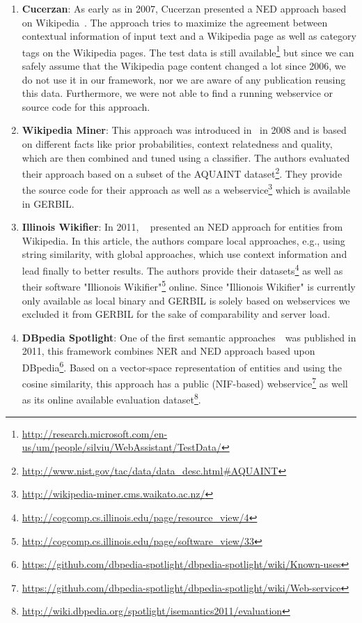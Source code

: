 \begin{enumerate}
\item \textbf{Cucerzan}: As early as in 2007, Cucerzan presented a NED approach based on Wikipedia~\cite{Cucerzan07}. The approach tries to maximize the agreement between contextual information of input text and a Wikipedia page as well as category tags on the Wikipedia pages.
The test data is still available\footnote{\url{http://research.microsoft.com/en-us/um/people/silviu/WebAssistant/TestData/}} but since we can safely assume that the Wikipedia page content changed a lot since 2006, we do not use it in our framework, nor we are aware of any publication reusing this data.
Furthermore, we were not able to find a running webservice or source code for this approach.

\item \textbf{Wikipedia Miner}: This approach was introduced in~\cite{milne2008learning} in 2008 and is based on different facts like prior probabilities, context relatedness and quality, which are then combined and tuned using a classifier.
The authors evaluated their approach based on a subset of the AQUAINT dataset\footnote{\url{http://www.nist.gov/tac/data/data_desc.html\#AQUAINT}}.
They provide the source code for their approach as well as a webservice\footnote{\url{http://wikipedia-miner.cms.waikato.ac.nz/}} which is available in GERBIL.

\item \textbf{Illinois Wikifier}: In 2011, ~\cite{rat:rot} presented an NED approach for entities from Wikipedia. 
In this article, the authors compare local approaches, e.g., using string similarity, with global approaches, which use context information and lead finally to better results.
The authors provide their datasets\footnote{\url{http://cogcomp.cs.illinois.edu/page/resource_view/4}} as well as their software "Illionois Wikifier"\footnote{\url{http://cogcomp.cs.illinois.edu/page/software_view/33}} online.
Since "Illionois Wikifier" is currently only available as local binary and GERBIL is solely based on webservices we excluded it from GERBIL for the sake of comparability and server load.

\item \textbf{DBpedia Spotlight}: One of the first semantic approaches~\cite{spotlight}\ was published in 2011, this framework combines NER and NED approach based upon DBpedia\footnote{\url{https://github.com/dbpedia-spotlight/dbpedia-spotlight/wiki/Known-uses}}. 
Based on a vector-space representation of entities and using the cosine similarity, this approach has a public (NIF-based) webservice\footnote{\url{https://github.com/dbpedia-spotlight/dbpedia-spotlight/wiki/Web-service}} as well as its online available evaluation dataset\footnote{\url{http://wiki.dbpedia.org/spotlight/isemantics2011/evaluation}}.


\end{enumerate}

